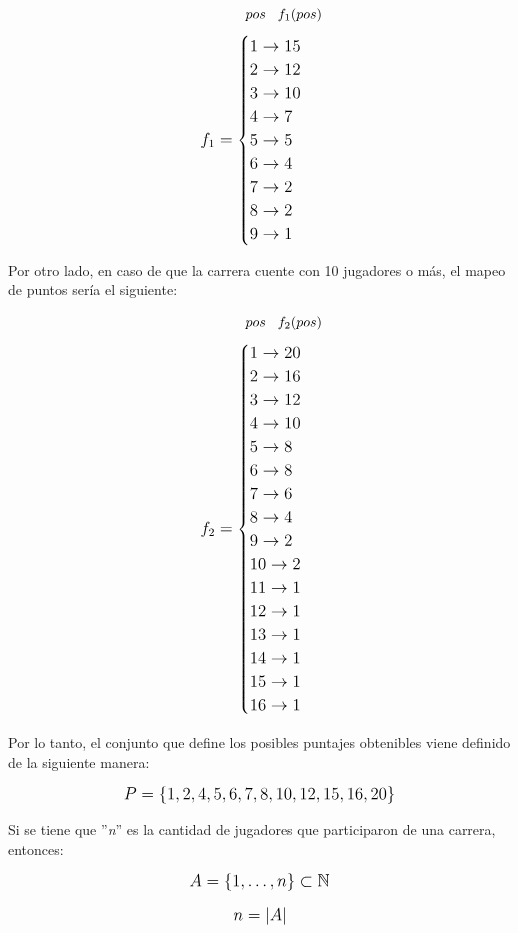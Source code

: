 \newpage

\[\hspace*{1.2cm} pos \hspace*{0.3cm} f_1(pos)\]
\[
\mathlarger{
	f_1= 
	\begin{cases}
		1 \to 15 \\
		2 \to 12 \\
		3 \to 10 \\
		4 \to 7 \\
		5 \to 5 \\
		6 \to 4 \\
		7 \to 2 \\
		8 \to 2 \\
		9 \to 1
	\end{cases}
}
\]

Por otro lado, en caso de que la carrera cuente con 10 jugadores o más, el mapeo de puntos sería el siguiente:

\[\hspace*{1.2cm} pos \hspace*{0.3cm} f_2(pos)\]
\[
\mathlarger{
	f_2= 
	\begin{cases}
		1 \to 20 \\
		2 \to 16 \\
		3 \to 12 \\
		4 \to 10 \\
		5 \to 8 \\
		6 \to 8 \\
		7 \to 6 \\
		8 \to 4 \\
		9 \to 2 \\
		10 \to 2 \\
		11 \to 1 \\
		12 \to 1 \\
		13 \to 1 \\
		14 \to 1 \\
		15 \to 1 \\
		16 \to 1
	\end{cases}
}
\]

Por lo tanto, el conjunto que define los posibles puntajes obtenibles viene definido de la siguiente manera:

\[
\mathlarger{
	P = \{1, 2, 4, 5, 6, 7, 8, 10, 12, 15, 16, 20\}
}
\]

Si se tiene que ''\textit{n}'' es la cantidad de jugadores que participaron de una carrera, entonces:

\[
\mathlarger{
	A = \{1, \dots, n\} \subset \mathbb{N}
}
\]

\[
\mathlarger{
	n = \lvert A \rvert
}
\]

